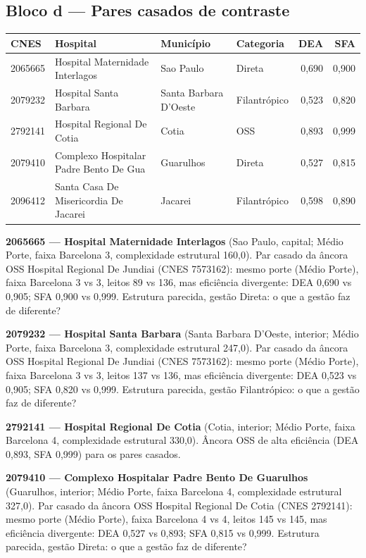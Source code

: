 \documentclass[12pt,a4paper]{article}
\begin{document}
\subsection{Bloco d --- Pares casados de contraste}
\begin{center}\small
\begin{tabular}{llllrr}
\toprule
CNES & Hospital & Município & Categoria & DEA & SFA \\
\midrule
2065665 & Hospital Maternidade Interlagos & Sao Paulo & Direta & 0,690 & 0,900 \\
2079232 & Hospital Santa Barbara & Santa Barbara D'Oeste & Filantrópico & 0,523 & 0,820 \\
2792141 & Hospital Regional De Cotia & Cotia & OSS & 0,893 & 0,999 \\
2079410 & Complexo Hospitalar Padre Bento De Gua & Guarulhos & Direta & 0,527 & 0,815 \\
2096412 & Santa Casa De Misericordia De Jacarei & Jacarei & Filantrópico & 0,598 & 0,890 \\
\bottomrule
\end{tabular}
\end{center}
\noindent\textbf{2065665 --- Hospital Maternidade Interlagos} (Sao Paulo, capital; Médio Porte, faixa Barcelona 3, complexidade estrutural 160,0). Par casado da âncora OSS Hospital Regional De Jundiai (CNES 7573162): mesmo porte (Médio Porte), faixa Barcelona 3 vs 3, leitos 89 vs 136, mas eficiência divergente: DEA 0,690 vs 0,905; SFA 0,900 vs 0,999. Estrutura parecida, gestão Direta: o que a gestão faz de diferente?\par\medskip
\noindent\textbf{2079232 --- Hospital Santa Barbara} (Santa Barbara D'Oeste, interior; Médio Porte, faixa Barcelona 3, complexidade estrutural 247,0). Par casado da âncora OSS Hospital Regional De Jundiai (CNES 7573162): mesmo porte (Médio Porte), faixa Barcelona 3 vs 3, leitos 137 vs 136, mas eficiência divergente: DEA 0,523 vs 0,905; SFA 0,820 vs 0,999. Estrutura parecida, gestão Filantrópico: o que a gestão faz de diferente?\par\medskip
\noindent\textbf{2792141 --- Hospital Regional De Cotia} (Cotia, interior; Médio Porte, faixa Barcelona 4, complexidade estrutural 330,0). Âncora OSS de alta eficiência (DEA 0,893, SFA 0,999) para os pares casados.\par\medskip
\noindent\textbf{2079410 --- Complexo Hospitalar Padre Bento De Guarulhos} (Guarulhos, interior; Médio Porte, faixa Barcelona 4, complexidade estrutural 327,0). Par casado da âncora OSS Hospital Regional De Cotia (CNES 2792141): mesmo porte (Médio Porte), faixa Barcelona 4 vs 4, leitos 145 vs 145, mas eficiência divergente: DEA 0,527 vs 0,893; SFA 0,815 vs 0,999. Estrutura parecida, gestão Direta: o que a gestão faz de diferente?\par\medskip
\end{document}
